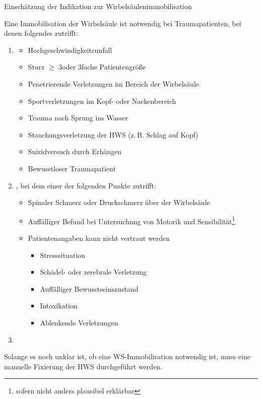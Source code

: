 {Einschätzung der Indikation zur Wirbelsäulenimmobilisation}
{\label{m:einschaetzung-indikation-ws-immobilisation}}
{%
Eine Immobilisation der Wirbelsäule ist notwendig bei
Traumapatienten, bei denen folgendes zutrifft:

\begin{enumerate}
  \item {}
  \begin{itemize}
    \item Hochgeschwindigkeitsunfall
    \item Sturz $\geq$ 3\Meter* oder 3fache Patientengröße
    \item Penetrierende Verletzungen im Bereich der
    Wirbelsäule
    \item Sportverletzungen im Kopf- oder Nackenbereich
    \item Trauma nach Sprung ins Wasser
    \item Stauchungsverletzung der HWS (z.\,B. Schlag auf
    Kopf)
    \item Suizidversuch durch Erhängen
    \item Bewusstloser Traumapatient
  \end{itemize}
  \item {}, bei dem einer der
  folgenden Punkte zutrifft:
  \begin{itemize}
    \item Spinaler Schmerz oder Druckschmerz über der
    Wirbelsäule
    \item Auffälliger Befund bei Untersuchung von Motorik
    und Sensibilität\footnote{sofern nicht anders plausibel
    erklärbar}
    \item Patientenangaben kann nicht vertraut
    werden
    \begin{itemize}
      \item Stresssituation
      \item Schädel- oder zerebrale Verletzung
      \item Auffälliger Bewusstseinszustand
      \item Intoxikation
      \item Ablenkende Verletzungen
    \end{itemize}
  \end{itemize}
  \item {}
\end{enumerate}

Solange es noch unklar ist, ob eine WS-Immobilisation
notwendig ist, muss eine manuelle Fixierung der HWS
durchgeführt werden.

\cite{ITLSde6,ScholzNotfallmedizin2,SiewertChirurgie8}
}

